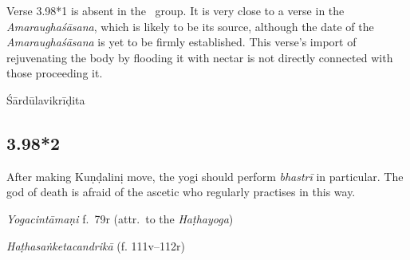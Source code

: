 \begin{ekdosis}
\begin{testimonia}[hp03_098_1]
\end{testimonia}

\begin{philcomm}[hp03_098_1]
Verse 3.98*1 is absent in the \textalpha\ group. It is very close to a verse in the \textit{Amaraughaśāsana}, which is likely to be its source, although the date of the \textit{Amaraughaśāsana} is yet to be firmly established. This verse's import of rejuvenating the body by flooding it with nectar is not directly connected with those proceeding it. 

\end{philcomm}

\begin{metre}[hp03_098_1]
Śārdūlavikrīḍita
\end{metre}

\subsection*{3.98*2}
\begin{translation}[hp03_098_2]
After making Kuṇḍalinị move, the yogi should perform \emph{bhastrī} in particular. The god of death is afraid of the ascetic who regularly practises in this way.
\end{translation}


\begin{testimonia}[hp03_098_2]
\emph{Yogacintāmaṇi} f.~79r (attr.~to the \emph{Haṭhayoga})
\begin{versinnote}
\end{versinnote}

\emph{Haṭhasaṅketacandrikā} (f. 111v–112r)
\begin{versinnote}
\end{versinnote}
\end{testimonia}


\end{ekdosis}
